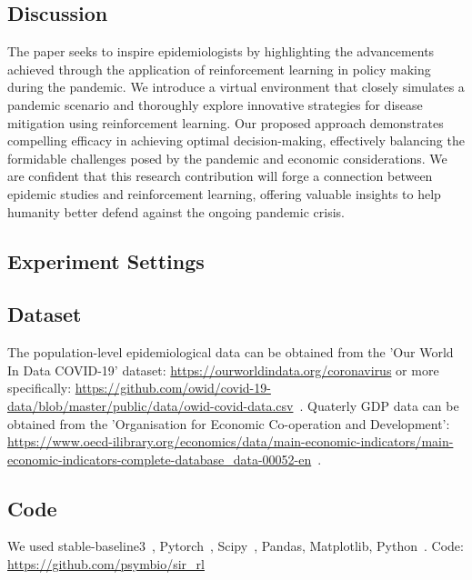 \documentclass[tikz,fleqn,12pt]{wlscirep}
\begin{document}
\subsection*{Discussion}
The paper seeks to inspire epidemiologists by highlighting the advancements achieved through the application of reinforcement learning in policy making during the pandemic. We introduce a virtual environment that closely simulates a pandemic scenario and thoroughly explore innovative strategies for disease mitigation using reinforcement learning. Our proposed approach demonstrates compelling efficacy in achieving optimal decision-making, effectively balancing the formidable challenges posed by the pandemic and economic considerations. We are confident that this research contribution will forge a connection between epidemic studies and reinforcement learning, offering valuable insights to help humanity better defend against the ongoing pandemic crisis.

\subsection*{Experiment Settings}
\subsection{Dataset}
The population-level epidemiological data can be obtained from the 'Our World In Data COVID-19' dataset: \url{https://ourworldindata.org/coronavirus} or more specifically: \url{https://github.com/owid/covid-19-data/blob/master/public/data/owid-covid-data.csv}~\cite{owidcoronavirus}. Quaterly GDP data can be obtained from the 'Organisation for Economic Co-operation and Development': \url{https://www.oecd-ilibrary.org/economics/data/main-economic-indicators/main-economic-indicators-complete-database_data-00052-en}~\cite{economic_indicators_data}.

\subsection{Code}
We used stable-baseline3~\cite{JMLR:v22:20-1364}, Pytorch~\cite{paszke2019pytorch}, Scipy~\cite{Virtanen_2020}, Pandas, Matplotlib, Python~\cite{ScientificPython}.
Code: \url{https://github.com/psymbio/sir_rl}
% 

\end{document}
